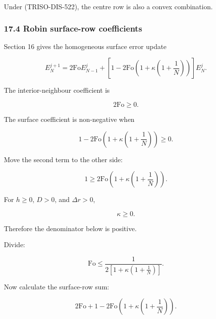 \documentclass[11pt,a4paper]{article}
\begin{document}
Under (TRISO-DIS-522), the centre row is also a convex combination.

\subsubsection*{17.4 Robin surface-row coefficients}

Section 16 gives the homogeneous surface error update

\begin{equation}
E_N^{j+1}
=
2\mathrm{Fo}E_{N-1}^j
+
\left[
1
-
2\mathrm{Fo}
\left(
1+\kappa\left(1+\frac1N\right)
\right)
\right]
E_N^j.
\tag{TRISO-DIS-525}
\label{eq:triso-dis-525}
\end{equation}

The interior-neighbour coefficient is

\begin{equation}
2\mathrm{Fo}\ge0.
\tag{TRISO-DIS-526}
\label{eq:triso-dis-526}
\end{equation}

The surface coefficient is non-negative when

\begin{equation}
1
-
2\mathrm{Fo}
\left(
1+\kappa\left(1+\frac1N\right)
\right)
\ge0.
\tag{TRISO-DIS-527}
\label{eq:triso-dis-527}
\end{equation}

Move the second term to the other side:

\begin{equation}
1
\ge
2\mathrm{Fo}
\left(
1+\kappa\left(1+\frac1N\right)
\right).
\tag{TRISO-DIS-528}
\label{eq:triso-dis-528}
\end{equation}

For $h\ge0$, $D>0$, and $\Delta r>0$,

\begin{equation}
\kappa\ge0.
\tag{TRISO-DIS-529}
\label{eq:triso-dis-529}
\end{equation}

Therefore the denominator below is positive.

Divide:

\begin{equation}
\boxed{
\mathrm{Fo}
\le
\frac{
1
}{
2\left[
1+\kappa\left(1+\frac1N\right)
\right]
}.
}
\tag{TRISO-DIS-530}
\label{eq:triso-dis-530}
\end{equation}

Now calculate the surface-row sum:

\begin{equation}
2\mathrm{Fo}
+
1
-
2\mathrm{Fo}
\left(
1+\kappa\left(1+\frac1N\right)
\right).
\tag{TRISO-DIS-531}
\label{eq:triso-dis-531}
\end{equation}
\end{document}

